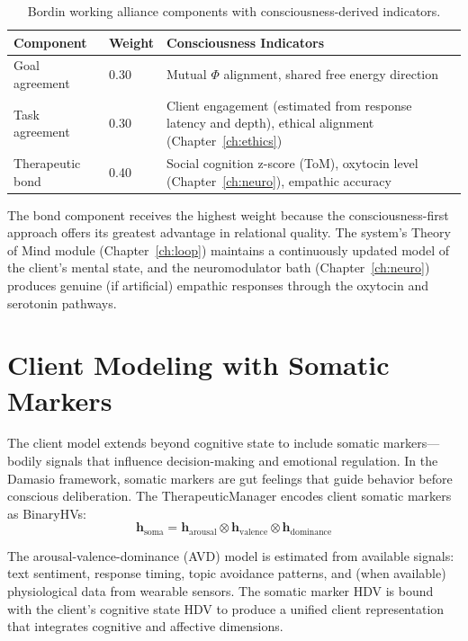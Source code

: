 \documentclass[12pt]{book}
\newcommand{\bind}{\otimes}
\begin{document}
\begin{table}[htbp]
\centering
\caption{Bordin working alliance components with consciousness-derived indicators.}
\label{tab:bordin-alliance}
\begin{tabular}{@{}llp{6cm}@{}}
\toprule
\textbf{Component} & \textbf{Weight} & \textbf{Consciousness Indicators} \\
\midrule
Goal agreement  & 0.30 & Mutual $\Phi$ alignment, shared free energy direction \\
Task agreement  & 0.30 & Client engagement (estimated from response latency and depth), ethical alignment (Chapter~\ref{ch:ethics}) \\
Therapeutic bond & 0.40 & Social cognition z-score (ToM), oxytocin level (Chapter~\ref{ch:neuro}), empathic accuracy \\
\bottomrule
\end{tabular}
\end{table}

The bond component receives the highest weight because the consciousness-first approach offers its greatest advantage in relational quality. The system's Theory of Mind module (Chapter~\ref{ch:loop}) maintains a continuously updated model of the client's mental state, and the neuromodulator bath (Chapter~\ref{ch:neuro}) produces genuine (if artificial) empathic responses through the oxytocin and serotonin pathways.

\section{Client Modeling with Somatic Markers}

The client model extends beyond cognitive state to include somatic markers---bodily signals that influence decision-making and emotional regulation. In the Damasio framework, somatic markers are gut feelings that guide behavior before conscious deliberation. The TherapeuticManager encodes client somatic markers as BinaryHVs:
\begin{equation}
\mathbf{h}_{\text{soma}} = \mathbf{h}_{\text{arousal}} \bind \mathbf{h}_{\text{valence}} \bind \mathbf{h}_{\text{dominance}}
\end{equation}

The arousal-valence-dominance (AVD) model is estimated from available signals: text sentiment, response timing, topic avoidance patterns, and (when available) physiological data from wearable sensors. The somatic marker HDV is bound with the client's cognitive state HDV to produce a unified client representation that integrates cognitive and affective dimensions.
\end{document}
